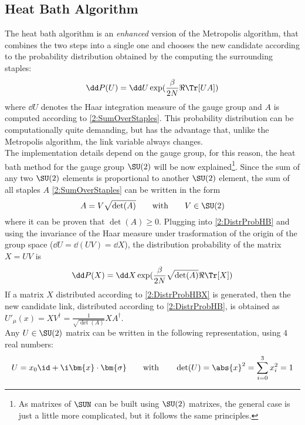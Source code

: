 \subsection{Heat Bath Algorithm}
The heat bath algorithm is an \emph{enhanced} version of the Metropolis algorithm, that combines the two steps into a single one and chooses the new candidate according to the probability distribution obtained by the computing the surrounding staples:
\begin{equation}
    \dd P(U) = \dd U \exp(\frac\beta{2N}\Re\Tr[U A]) \label{2:DistrProbHB}
\end{equation}
where $\dd U$ denotes the Haar integration measure of the gauge group and $A$ is computed according to \eqref{2:SumOverStaples}.
This probability distribution can be computationally quite demanding, but has the advantage that, unlike the Metropolis algorithm, the link variable always changes.\\
The implementation details depend on the gauge group, for this reason, the heat bath method for the gauge group $\SU(2)$ will be now explained\footnote{As matrixes of $\SUN$ can be built using $\SU(2)$ matrixes, the general case is just a little more complicated, but it follows the same principles.}.
Since the sum of any two $\SU(2)$ elements is proportional to another $\SU(2)$ element, the sum of all staples $A$ \eqref{2:SumOverStaples} can be written in the form
\begin{equation}
    A = V\sqrt{\det(A)} \qquad\text{with}\qquad V\in\SU(2) \label{2:SumOverStaplesSU2}
\end{equation}
where it can be proven that $\det(A)\geq0$.
Plugging into \eqref{2:DistrProbHB} and using the invariance of the Haar measure under trasformation of the origin of the group space ($\dd U = \dd (UV) = \dd X$), the distribution probability of the matrix $X=UV$ is
\begin{equation}
    \dd P(X) = \dd X \exp(\frac\beta{2N}\sqrt{\det(A)}\Re\Tr[X]) \label{2:DistrProbHBX}
\end{equation}
If a matrix $X$ distributed according to \eqref{2:DistrProbHBX} is generated, then the new candidate link, distributed according to \eqref{2:DistrProbHB}, is obtained as $U'_\mu(x) = XV^\dagger = \frac1{\sqrt{\det(A)}}XA^\dagger$.\\
Any $U\in\SU(2)$ matrix can be written in the following representation, using $4$ real numbers:
\begin{equation}
    U=x_0\id+\i \bm{x} \cdot \bm{\sigma} \qquad\text{with}\qquad \det(U)=\abs{x}^2=\sum_{i=0}^3x_i^2=1 \label{2:SU2Repr}
\end{equation}
